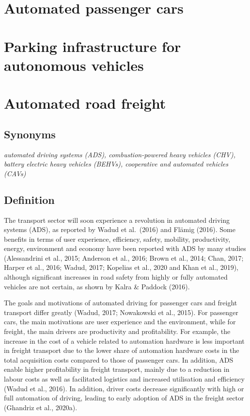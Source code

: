 \documentclass[
]{book}
\begin{document}
\hypertarget{av}{%
\section{Automated passenger cars}\label{av}}

\hypertarget{parking_av}{%
\section{Parking infrastructure for autonomous vehicles}\label{parking_av}}

\hypertarget{automated_road_freight}{%
\section{Automated road freight}\label{automated_road_freight}}

\hypertarget{synonyms-20}{%
\subsection*{Synonyms}\label{synonyms-20}}

\emph{automated driving systems (ADS), combustion-powered heavy vehicles (CHV), battery electric heavy vehicles (BEHVs), cooperative and automated vehicles (CAVs)}

\hypertarget{definition-22}{%
\subsection*{Definition}\label{definition-22}}

The transport sector will soon experience a revolution in automated driving systems (ADS), as reported by Wadud et al.~(2016) and Flämig (2016). Some benefits in terms of user experience, efficiency, safety, mobility, productivity, energy, environment and economy have been reported with ADS by many studies (Alessandrini et al., 2015; Anderson et al., 2016; Brown et al., 2014; Chan, 2017; Harper et al., 2016; Wadud, 2017; Kopelias et al., 2020 and Khan et al., 2019), although significant increases in road safety from highly or fully automated vehicles are not certain, as shown by Kalra \& Paddock (2016).

The goals and motivations of automated driving for passenger cars and freight transport differ greatly (Wadud, 2017; Nowakowski et al., 2015). For passenger cars, the main motivations are user experience and the environment, while for freight, the main drivers are productivity and profitability. For example, the increase in the cost of a vehicle related to automation hardware is less important in freight transport due to the lower share of automation hardware costs in the total acquisition costs compared to those of passenger cars. In addition, ADS enable higher profitability in freight transport, mainly due to a reduction in labour costs as well as facilitated logistics and increased utilisation and efficiency (Wadud et al., 2016). In addition, driver costs decrease significantly with high or full automation of driving, leading to early adoption of ADS in the freight sector (Ghandriz et al., 2020a).
\end{document}
